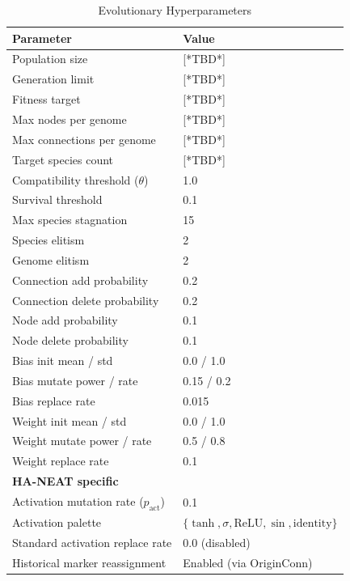 \documentclass[12pt]{article}
\begin{document}
\begin{table}[h]
\centering
\caption{Evolutionary Hyperparameters}
\begin{tabular}{|l|l|}
\hline
\textbf{Parameter} & \textbf{Value} \\
\hline
Population size & [*TBD*] \\
\hline
Generation limit & [*TBD*] \\
\hline
Fitness target & [*TBD*] \\
\hline
Max nodes per genome & [*TBD*] \\
\hline
Max connections per genome & [*TBD*] \\
\hline
Target species count & [*TBD*] \\
\hline
Compatibility threshold ($\theta$) & 1.0 \\
\hline
Survival threshold & 0.1 \\
\hline
Max species stagnation & 15 \\
\hline
Species elitism & 2 \\
\hline
Genome elitism & 2 \\
\hline
Connection add probability & 0.2 \\
\hline
Connection delete probability & 0.2 \\
\hline
Node add probability & 0.1 \\
\hline
Node delete probability & 0.1 \\
\hline
Bias init mean / std & 0.0 / 1.0 \\
\hline
Bias mutate power / rate & 0.15 / 0.2 \\
\hline
Bias replace rate & 0.015 \\
\hline
Weight init mean / std & 0.0 / 1.0 \\
\hline
Weight mutate power / rate & 0.5 / 0.8 \\
\hline
Weight replace rate & 0.1 \\
\hline
\textbf{HA-NEAT specific} & \\
\hline
Activation mutation rate ($p_{\text{act}}$) & 0.1 \\
\hline
Activation palette & $\{\tanh, \sigma, \text{ReLU}, \sin, \text{identity}\}$ \\
\hline
Standard activation replace rate & 0.0 (disabled) \\
\hline
Historical marker reassignment & Enabled (via OriginConn) \\
\hline
\end{tabular}
\end{table}
\end{document}
